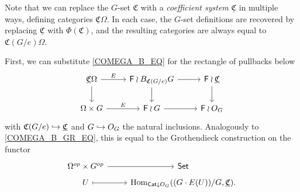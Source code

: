 \documentclass[a4paper,10pt
,draft
]{article}%
\newcommand{\UC}{\underline{\mathfrak C}}
\renewcommand{\1}{\ensuremath{\mathbb{id}}}
\begin{document}
\begin{remark}
      Note that we can replace the $G$-set $\mathfrak C$ with a
      \textit{coefficient system} $\underline{\mathfrak C}$ in multiple ways,
      defining categories $\UC\Omega$.
      In each case, the $G$-set definitions are recovered by replacing $\UC$ with $\Phi(\mathfrak C)$,
      and the resulting categories are always equal to $\mathfrak C(G/e)\Omega$.

      
      First, we can substitute \eqref{COMEGA_B_EQ} for the rectangle of pullbacks below
      \begin{equation}
            \label{COMEGA_OG_EQ}
            \begin{tikzcd}
                  \underline{\mathfrak C}\Omega \arrow[d] \arrow[r, "E"]
                  &
                  \mathsf F \wr B_{\mathfrak C(G/e)}G \arrow[r] \arrow[d]
                  &
                  \mathsf F \wr \underline{\mathfrak C} \arrow[d]
                  \\
                  \Omega \times G \arrow[r, "E"]
                  &
                  \mathsf F \wr G \arrow[r]
                  &
                  \mathsf F \wr O_G
            \end{tikzcd}
      \end{equation}
      with $\mathfrak C(G/e) \hookrightarrow \underline{\mathfrak C}$ and $G \hookrightarrow O_G$ the natural inclusions.
      Analogously to \eqref{COMEGA_B_GR_EQ}, this is equal to the Grothendieck construction on the functor
      \begin{equation}
            \label{COMEGA_OG_GR_EQ}
            \begin{tikzcd}[row sep = tiny]
                  \Omega^{op} \times G^{op} \arrow[r]
                  &
                  \mathsf{Set}
                  \\
                  U \arrow[r, mapsto]
                  &
                  \Hom_{\mathsf{Cat} \downarrow O_G}((G \cdot E(U))/G, \UC).
            \end{tikzcd}
      \end{equation}



\end{remark}
\end{document}

